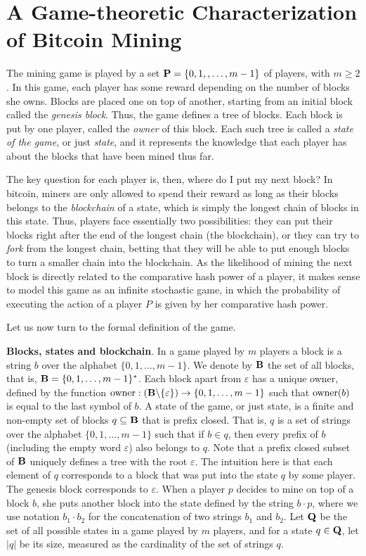 
\section{A Game-theoretic Characterization of Bitcoin Mining}
\label{sec-formalization}

The mining game is played by a set $\mathbf{P} = \{0, 1, , \ldots, m-1\}$ of players, with $m \geq 2$.
In this game, each player has some reward depending on the number of blocks she owns. Blocks are placed one on top of another, starting from an initial block called the {\em genesis block}. Thus, the game defines a tree of blocks. Each block is put by one player, called the {\em owner} of this block. Each such tree is called a {\em state of the game}, or just {\em state}, and it represents the knowledge that each player has about the blocks that have been mined thus far. 

The key question for each player is, then, where do I put my next block? In bitcoin, miners are only allowed to spend their reward as long 
as their blocks belongs to the \emph{blockchain} of a state, which is simply the longest chain of blocks in this state. Thus, players face essentially two possibilities: they can put their blocks right after the end of the longest chain (the blockchain), or they can try to \emph{fork} 
from the longest chain, betting that they will be able to put enough blocks to turn a smaller chain into the blockchain. As the likelihood of 
mining the next block is directly related to the comparative hash power of a player, it makes sense to model this game as an infinite 
stochastic game, in which the probability of executing the action of a player $P$ is given by her comparative hash power. 

Let us now turn to the formal definition of the game. 

\medskip
\noindent
\textbf{Blocks, states and blockchain}. In a game played by $m$ players a block is a string $b$ over the alphabet $\{0,1,\ldots, m-1\}$. We denote by $\mathbf{B}$ the set of all blocks, that is, $\mathbf{B} = \{0,1,\ldots , m-1\}^*$. Each block apart from $\varepsilon$ has a unique owner, defined by the function $\text{\rm owner}: (\mathbf{B} \backslash \{\varepsilon\}) \rightarrow \{0,1, \ldots ,m-1\}$ such that $\text{\rm owner}(b)$ is equal to the last symbol of $b$. A state of the game, or just state,  is a finite and non-empty set of blocks $q \subseteq \mathbf{B}$ that is prefix closed. That is, $q$ is a set of strings over the alphabet $\{0,1,\ldots, m-1\}$ such that if $b\in q$, then every prefix of $b$ (including the empty word $\varepsilon$) also belongs to $q$. Note that a prefix closed subset of $\mathbf{B}$ uniquely defines a tree with the root $\varepsilon$. 
%
The intuition here is that each element of $q$ corresponds to a block that was put into the state $q$ by some player. The genesis block corresponds to $\varepsilon$. When a player $p$ decides to mine on top of a block $b$, she puts another block into the state defined by the string $b\cdot p$, where we use notation $b_1 \cdot b_2$ for the concatenation of two strings $b_1$ and $b_2$.
%
Let $\mathbf{Q}$ be the set of all possible states in a game played by $m$ players, and for a state $q \in \mathbf{Q}$, let $|q|$ be its size, measured as the cardinality of the set of strings $q$. 

